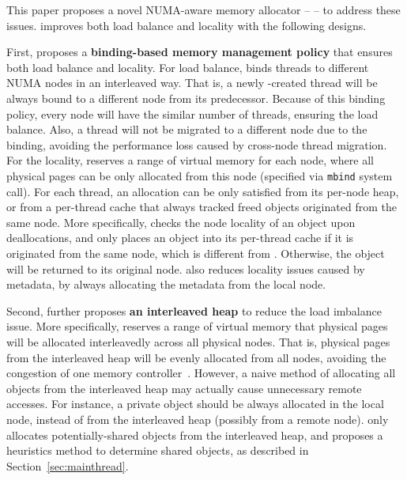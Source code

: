 This paper proposes a novel NUMA-aware memory allocator -- \NM{} -- to address these  issues. \NM{} improves both load balance and locality with the following designs.  

First, \NM{} proposes a \textbf{binding-based memory management policy} that ensures both load balance and locality. For load balance, \NM{} binds threads to different NUMA nodes in an interleaved way. That is, a newly -created thread will be always bound to a different node from its predecessor. Because of this binding policy, every node will have the similar number of threads, ensuring the load balance. Also, a thread will not be migrated to a different node due to the binding, avoiding the performance loss caused by cross-node thread migration. For the locality, \NM{} reserves a range of virtual memory for each node, where all physical pages can be only allocated from this node (specified via \texttt{mbind} system call). For each thread, an allocation can be only satisfied from its per-node heap, or from a per-thread cache that always tracked freed objects originated from the same node. More specifically, \NM{} checks the node locality of an object upon deallocations, and only places an object into its per-thread cache if it is originated from the same node, which is different from \TN{}. Otherwise, the object will be returned to its original node. \NM{} also reduces locality issues caused by metadata, by always allocating the metadata from the local node.  


  
Second, \NM{} further proposes \textbf{an interleaved heap} to reduce the load imbalance issue. More specifically, \NM{} reserves a range of virtual memory that physical pages will be allocated interleavedly across all physical nodes. That is,  physical pages from the interleaved heap will be evenly allocated from all nodes, avoiding the congestion of one memory controller~\cite{Blagodurov:2011:CNC:2002181.2002182}. However, a naive method of allocating all objects from the interleaved heap may actually cause unnecessary remote accesses. For instance, a private object should be always allocated in the local node, instead of from the interleaved heap (possibly from a remote node). \NM{} only allocates potentially-shared objects from the interleaved heap, and proposes a heuristics method to determine shared objects, as described in Section~\ref{sec:mainthread}.  

